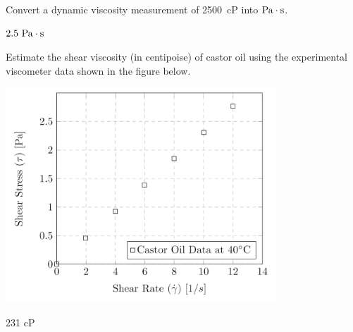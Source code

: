 \documentclass[multi,preview,varwidth=false,border=5,12pt]{standalone}
\begin{document}
\begin{question}
Convert a dynamic viscosity measurement of 2500~cP into $\mathrm{Pa}\cdot \mathrm{s}$.

\begin{solution}
$2.5~\mathrm{Pa}\cdot \mathrm{s}$
\end{solution}
\end{question}


\begin{question}

 Estimate the shear viscosity (in centipoise) of castor oil using the experimental viscometer data shown in the figure below.

 \includegraphics[width=4in]{imgs/CastorOil.png}

\begin{solution}
231 cP
\end{solution}
\end{question}
\end{document}
